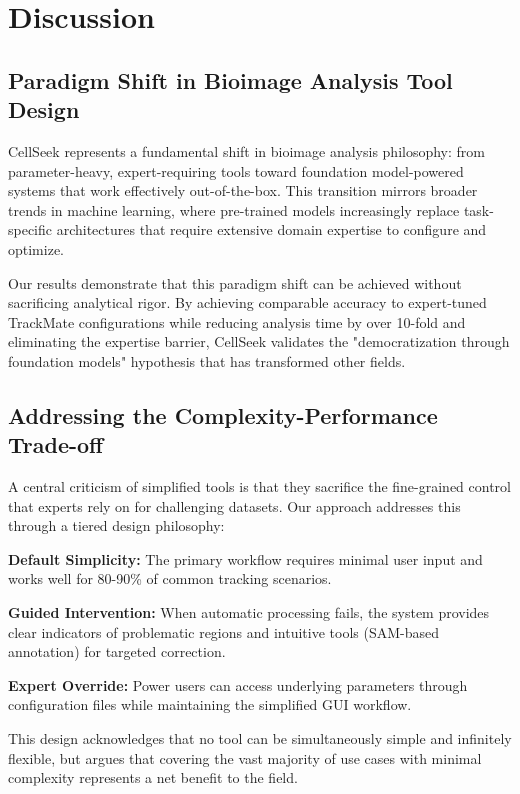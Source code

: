 \documentclass[../cellseek_paper.tex]{subfiles}
\begin{document}
\section{Discussion}

\subsection{Paradigm Shift in Bioimage Analysis Tool Design}

CellSeek represents a fundamental shift in bioimage analysis philosophy: from parameter-heavy, expert-requiring tools toward foundation model-powered systems that work effectively out-of-the-box. This transition mirrors broader trends in machine learning, where pre-trained models increasingly replace task-specific architectures that require extensive domain expertise to configure and optimize.

Our results demonstrate that this paradigm shift can be achieved without sacrificing analytical rigor. By achieving comparable accuracy to expert-tuned TrackMate configurations while reducing analysis time by over 10-fold and eliminating the expertise barrier, CellSeek validates the "democratization through foundation models" hypothesis that has transformed other fields.

\subsection{Addressing the Complexity-Performance Trade-off}

A central criticism of simplified tools is that they sacrifice the fine-grained control that experts rely on for challenging datasets. Our approach addresses this through a tiered design philosophy:

\textbf{Default Simplicity:} The primary workflow requires minimal user input and works well for 80-90\% of common tracking scenarios.

\textbf{Guided Intervention:} When automatic processing fails, the system provides clear indicators of problematic regions and intuitive tools (SAM-based annotation) for targeted correction.

\textbf{Expert Override:} Power users can access underlying parameters through configuration files while maintaining the simplified GUI workflow.

This design acknowledges that no tool can be simultaneously simple and infinitely flexible, but argues that covering the vast majority of use cases with minimal complexity represents a net benefit to the field.
\end{document}
